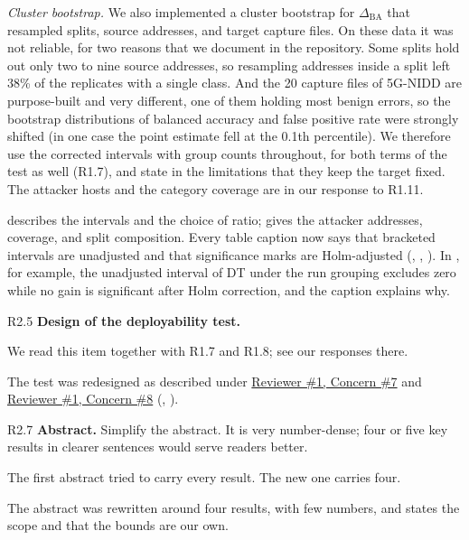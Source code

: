 \emph{Cluster bootstrap.} We also implemented a cluster bootstrap for $\Delta_{\mathrm{BA}}$ that resampled splits, source addresses, and target capture files. On these data it was not reliable, for two reasons that we document in the repository. Some splits hold out only two to nine source addresses, so resampling addresses inside a split left 38\% of the replicates with a single class. And the 20 capture files of 5G-NIDD are purpose-built and very different, one of them holding most benign errors, so the bootstrap distributions of balanced accuracy and false positive rate were strongly shifted (in one case the point estimate fell at the 0.1th percentile). We therefore use the corrected intervals with group counts throughout, for both terms of the test as well (R1.7), and state in the limitations that they keep the target fixed. The attacker hosts and the category coverage are in our response to R1.11.

\action {} describes the intervals and the choice of ratio;  gives the attacker addresses, coverage, and split composition. Every table caption now says that bracketed intervals are unadjusted and that significance marks are Holm-adjusted (, , ). In , for example, the unadjusted interval of DT under the run grouping excludes zero while no gain is significant after Holm correction, and the caption explains why.

\label{rv:R2.5}
\begin{concern}{R2.5}
\textbf{Design of the deployability test.}
\end{concern}
\response We read this item together with R1.7 and R1.8; see our responses there.

\action The test was redesigned as described under \hyperref[rv:R1.7]{Reviewer \#1, Concern \#7} and \hyperref[rv:R1.8]{Reviewer \#1, Concern \#8} (, ).



\label{rv:R2.7}
\begin{concern}{R2.7}
\textbf{Abstract.} Simplify the abstract. It is very number-dense; four or five key results in clearer sentences would serve readers better.
\end{concern}
\response The first abstract tried to carry every result. The new one carries four.

\action The abstract was rewritten around four results, with few numbers, and states the scope and that the bounds are our own.

